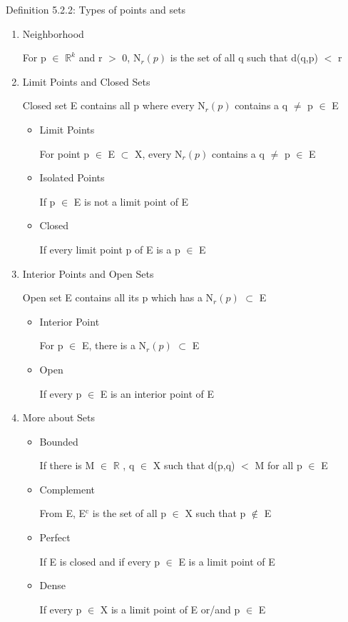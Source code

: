 { \color{blue} Definition 5.2.2: Types of points and sets } 
	\begin{enumerate}[label=(\alph*), leftmargin=2cm]
		\item {\color{lblue} Neighborhood}

			\qquad For p $\in$ $\mathbb{R}^k$ and r $>$ 0, N$_r(p)$ is the set of all q
			such that d(q,p) $<$ r

		\item {\color{lblue} Limit Points and Closed Sets}

			\qquad Closed set E contains all p where every N$_r(p)$ contains
			a q $\neq$ p $\in$ E
			\begin{itemize}[leftmargin=1cm]
				\item Limit Points

					\qquad For point p $\in$ E $\subset$ X, every N$_r(p)$ contains a
					q $\neq$ p $\in$ E
				
				\item Isolated Points

					\qquad If p $\in$ E is not a limit point of E

				\item Closed

					\qquad If every limit point p of E is a p $\in$ E
			\end{itemize}

		\item {\color{lblue} Interior Points and Open Sets}

			\qquad Open set E contains all its p which has a N$_r(p)$ $\subset$ E
			\begin{itemize}[leftmargin=1cm]
				\item Interior Point

					\qquad For p $\in$ E, there is a N$_r(p)$ $\subset$ E

				\item Open

					\qquad If every p $\in$ E is an interior point of E
			\end{itemize}

		\item {\color{lblue} More about Sets}
			\begin{itemize}[leftmargin=1cm]
				\item Bounded

					\qquad If there is M $\in$ $\mathbb{R}$ , q $\in$ X such that d(p,q) $<$ M
					for all p $\in$ E

				\item Complement

					\qquad From E, E$^\text{c}$ is the set of all p $\in$ X such that p $\not \in$ E

				\item Perfect

					\qquad If E is closed and if every p $\in$ E is a limit point of E

				\item Dense

					\qquad If every p $\in$ X is a limit point of E or/and p $\in$ E
			\end{itemize}
	\end{enumerate}

